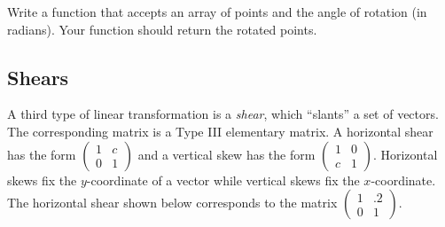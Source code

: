 \begin{problem}
Write a function that accepts an array of points and the angle of rotation (in radians).
Your function should return the rotated points.
\end{problem}

\subsection*{Shears} %

A third type of linear transformation is a \emph{shear}, which ``slants'' a set of vectors.
The corresponding matrix is a Type III elementary matrix.
A horizontal shear has the form $\begin{pmatrix}
1 & c \\
0 & 1
\end{pmatrix}$ and a vertical skew has the form $
 \begin{pmatrix}
1 & 0 \\
c & 1
\end{pmatrix}
$.
Horizontal skews fix the $y$-coordinate of a vector while vertical skews fix the $x$-coordinate.
The horizontal shear shown below corresponds to the matrix $\begin{pmatrix}
1 & .2 \\
0 & 1
\end{pmatrix}
$.

